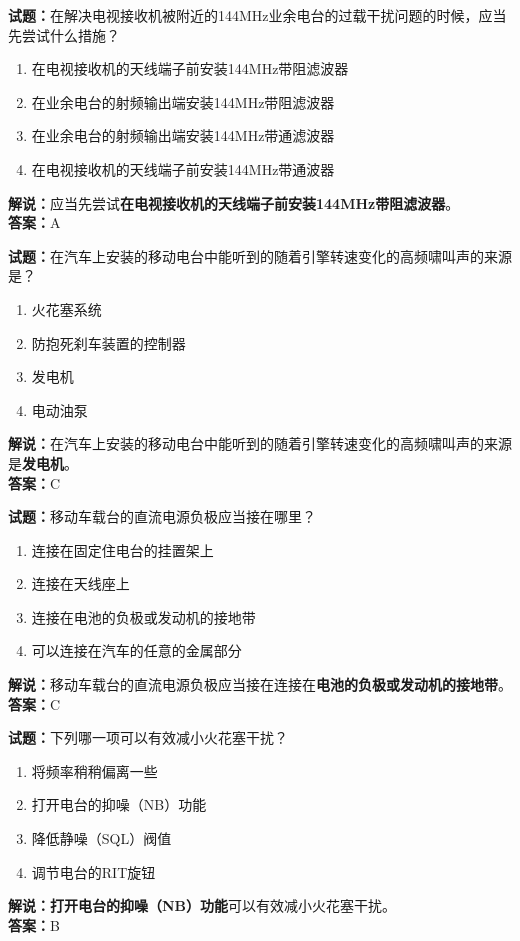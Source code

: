 \documentclass{ctexbook}
\begin{document}
\noindent\textbf{试题：}在解决电视接收机被附近的144\unit{\MHz}业余电台的过载干扰问题的时候，应当先尝试什么措施？
\begin{enumerate}[leftmargin=3em]
\item 在电视接收机的天线端子前安装144\unit{\MHz}带阻滤波器
\item 在业余电台的射频输出端安装144\unit{\MHz}带阻滤波器
\item 在业余电台的射频输出端安装144\unit{\MHz}带通滤波器
\item 在电视接收机的天线端子前安装144\unit{\MHz}带通波器
\end{enumerate}
\noindent\textbf{解说：}应当先尝试\textbf{在电视接收机的天线端子前安装144\unit{\MHz}带阻滤波器}。\\\noindent\textbf{答案：}A



\bigskip


\noindent\textbf{试题：}在汽车上安装的移动电台中能听到的随着引擎转速变化的高频啸叫声的来源是？
\begin{enumerate}[leftmargin=3em]
\item 火花塞系统
\item 防抱死刹车装置的控制器
\item 发电机
\item 电动油泵
\end{enumerate}
\noindent\textbf{解说：}在汽车上安装的移动电台中能听到的随着引擎转速变化的高频啸叫声的来源是\textbf{发电机}。\\\noindent\textbf{答案：}C



\bigskip


\noindent\textbf{试题：}移动车载台的直流电源负极应当接在哪里？
\begin{enumerate}[leftmargin=3em]
\item 连接在固定住电台的挂置架上
\item 连接在天线座上
\item 连接在电池的负极或发动机的接地带
\item 可以连接在汽车的任意的金属部分
\end{enumerate}
\noindent\textbf{解说：}移动车载台的直流电源负极应当接在连接在\textbf{电池的负极或发动机的接地带}。\\\noindent\textbf{答案：}C



\bigskip


\noindent\textbf{试题：}下列哪一项可以有效减小火花塞干扰？
\begin{enumerate}[leftmargin=3em]
\item 将频率稍稍偏离一些
\item 打开电台的抑噪（NB）功能
\item 降低静噪（SQL）阀值
\item 调节电台的RIT旋钮
\end{enumerate}
\noindent\textbf{解说：}\textbf{打开电台的抑噪（NB）功能}可以有效减小火花塞干扰。\\\noindent\textbf{答案：}B
\end{document}
